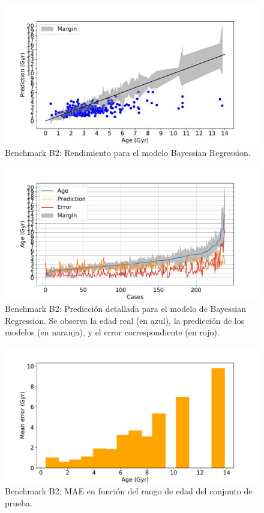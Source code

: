 \begin{figure}[H]
\begin{center}
 \includegraphics[width=0.8\linewidth]{Figuras/Experimentos/B_B2_bayes_1.pdf}
\end{center}
\caption{Benchmark B2: Rendimiento para el modelo Bayessian Regression.}
 \label{fig:benchB2_best_1}
\end{figure}

\begin{figure}[H]
\begin{center}
 \includegraphics[width=0.8\linewidth]{Figuras/Experimentos/B_B2_bayes_2.pdf}
\end{center}
\caption{Benchmark B2: Predicción detallada para el modelo de Bayessian Regression. Se observa la edad real (en azul), la predicción de los modelos (en naranja), y el error correspondiente (en rojo).}
 \label{fig:benchB2_best_2}
\end{figure}

\begin{figure}[H]
\begin{center}
 \includegraphics[width=0.8\linewidth]{Figuras/Experimentos/B_B2_bayes_3.pdf}
\end{center}
\caption{Benchmark B2: MAE en función del rango de edad del conjunto de prueba.}
 \label{fig:benchB2_best_3}
\end{figure}


